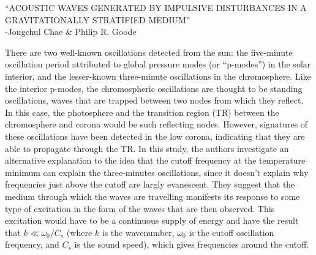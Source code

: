 \documentclass[12pt]{article}
\begin{document}
\begin{center}
    ``ACOUSTIC WAVES GENERATED BY IMPULSIVE DISTURBANCES IN A
    GRAVITATIONALLY STRATIFIED MEDIUM''\\
    -Jongchul Chae \& Philip R. Goode
\end{center}


There are two well-known oscillations detected from the sun: the five-minute
oscillation period attributed to global pressure modes (or ``p-modes'')
in the solar interior, and the
lesser-known three-minute oscillations in the chromosphere.
Like the interior p-modes, the chromospheric oscillations are thought to
be standing oscillations, waves that are trapped between two nodes from which
they reflect.
In this case, the photosphere and the transition region (TR) between the
chromosphere and corona would be such reflecting nodes. However, signatures
of these oscillations have been detected in the low corona, indicating that
they are able to propagate through the TR\@.
In this study, the authors
investigate an alternative explanation to the idea that the cutoff frequency
at the temperature minimum can explain the three-minutes oscillations, since
it doesn't explain why
frequencies just above the cutoff are largly evanescent.
They suggest that the medium through which the waves are
travelling manifests its response to some type of excitation
in the form of the waves that are then observed. This excitation would have
to be a continuous supply of energy and have the result that
$k \ll \omega_0/C_s$ (where $k$ is the wavenumber, $\omega_0$ is the cutoff
oscillation frequency, and $C_s$ is the sound speed), which gives frequencies around
the cutoff.


%
\end{document}
